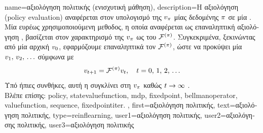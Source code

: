 {name={\foreignlanguage{greek}{αξιολόγηση πολιτικής (ενισχυτική μάθηση)}},
	description={\foreignlanguage{greek}{Η αξιολόγηση}  
		(policy evaluation) \foreignlanguage{greek}{αναφέρεται 
		στον υπολογισμό της}  $v_{\pi}$ 
		\foreignlanguage{greek}{μίας δεδομένης}  $\pi$ \foreignlanguage{greek}{σε μία} 
		. \foreignlanguage{greek}{Μία ευρέως χρησιμοποιούμενη μεθοδος, η οποία αναφέρεται ως
		επαναληπτική αξιολόγηση} , \foreignlanguage{greek}{βασίζεται στον χαρακτηρισμό της} 
		$v_{\pi}$ \foreignlanguage{greek}{ως}  \foreignlanguage{greek}{του} 
		 $\mathcal{F}^{(\pi)}$. \foreignlanguage{greek}{Συγκεκριμένα, 
		ξεκινώντας από μία αρχική}  $v_{0}$, 
		\foreignlanguage{greek}{εφαρμόζουμε επαναληπτικά τον}  $\mathcal{F}^{(\pi)}$, 
		\foreignlanguage{greek}{ώστε να προκύψει μία}   
		$v_{1}, \,v_{2}, \,\ldots$ 	\foreignlanguage{greek}{σύμφωνα με} 
		\[
		v_{t+1} = \mathcal{F}^{(\pi)} v_{t}, \quad t=0,\,1,\,2,\,\ldots
		\]
		\foreignlanguage{greek}{Υπό ήπιες συνθήκες, αυτή η}  \foreignlanguage{greek}{συγκλίνει στη} 
		$v_{\pi}$ \foreignlanguage{greek}{καθώς} $t \rightarrow \infty$ \cite[\foreignlanguage{greek}{Ενότητα} 4.2]{SuttonEd2}.
		\\
		\foreignlanguage{greek}{Βλέπε επίσης:} \gls{policy}, \gls{statevaluefunction}, \gls{mdp}, \gls{fixedpoint}, 
		\gls{bellmanoperator}, \gls{valuefunction}, \gls{sequence}, \gls{fixedpointiter}. }, 
	first={\foreignlanguage{greek}{αξιολόγηση πολιτικής}},
	text={\foreignlanguage{greek}{αξιολόγηση πολιτικής}},
	type=reinflearning,
	user1={\foreignlanguage{greek}{αξιολόγηση πολιτικής}}, %
  	user2={\foreignlanguage{greek}{αξιολόγησης πολιτικής}}, %
	user3={\foreignlanguage{greek}{αξιολόγηση πολιτικής}} %
}

